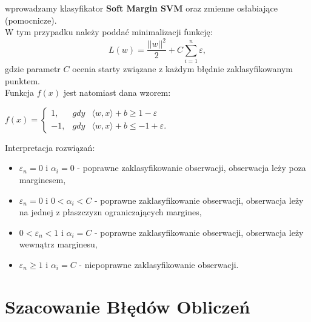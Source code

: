 \documentclass[12pt,a4paper]{report}
\begin{document}
wprowadzamy klasyfikator \textbf{Soft Margin SVM} oraz zmienne osłabiające (pomocnicze).
\\W tym przypadku należy poddać minimalizacji funkcję:
$$L(w) = \frac{||w||^2}{2} + C \sum_{i=1}^n \varepsilon,$$
gdzie parametr $C$ ocenia starty związane z każdym błędnie zaklasyfikowanym punktem.
\\Funkcja $f(x)$ jest natomiast dana wzorem:
\begin{center}
$f(x) = 
\left\{\begin{array}{lll}
1, & gdy &   \langle w,x \rangle + b \geq 1 - \varepsilon\\
-1, &   gdy &   \langle w,x \rangle + b \leq -1 + \varepsilon.
\end{array} \right.$
\end{center}
Interpretacja rozwiązań:
\begin{itemize}
\item $\varepsilon_n =0$ i $\alpha_i =0$ - poprawne zaklasyfikowanie obserwacji, obserwacja leży poza marginesem,
\item $\varepsilon_n =0$ i $0<\alpha_i <C$ - poprawne zaklasyfikowanie obserwacji, obserwacja leży na jednej z płaszczyzn ograniczających margines,
\item $0<\varepsilon_n <1$ i $\alpha_i =C$ - poprawne zaklasyfikowanie obserwacji, obserwacja leży wewnątrz marginesu,
\item $\varepsilon_n \geq 1$ i $\alpha_i =C$ - niepoprawne zaklasyfikowanie obserwacji.
\end{itemize}

\section{Szacowanie Błędów Obliczeń}
\end{document}
